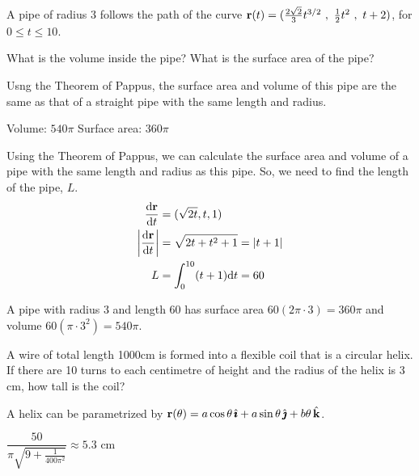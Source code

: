 \begin{question}
A pipe of radius 3 follows the path of the curve $\mathbf{r}(t)=(\frac{2\sqrt2}{3}t^{3/2}~,~\frac12t^2~,~t+2)$, for $0 \le t \le 10$. 

What is the volume inside the pipe? What is the surface area of the pipe?
\end{question}
\begin{hint}
Usng the Theorem of Pappus, the surface area and volume of this pipe are the same as that of a straight pipe with the same length and radius.
\end{hint}
\begin{answer}
Volume: $540 \pi$ \qquad Surface area: $360\pi$
\end{answer}
\begin{solution}
Using the Theorem of Pappus, we can calculate the surface area and volume of a pipe with the same length and radius as this pipe. So, we need to find the length of the pipe, $L$. 
\begin{align*}
\diff{\vr}{t}&=(\sqrt{2t},t,1)\\
\left| \diff{\vr}{t}\right|&=\sqrt{2t+t^2+1}=|t+1|\\
L&=\int_0^{10}(t+1)\dee{t}=60
\end{align*}

A pipe with radius 3 and length 60 has surface area $60(2\pi\cdot 3)=360\pi$ 
and volume $60(\pi \cdot3^2)=540\pi$.

\end{solution}

\begin{question}
A wire of total length 1000cm is formed into a flexible coil that is a 
circular helix. If there are 10 turns to each centimetre of height and the 
radius of the helix is 3 cm, how tall is the coil?
\end{question}

\begin{hint} 
A helix can be parametrized by 
$\mathbf{r}(\theta)=a\cos\theta\,\hat{\pmb{\imath}}+a\sin\theta\,\hat{\pmb{\jmath}}+b\theta\,\hat{\mathbf{k}}$.
\end{hint}

\begin{answer}
$\dfrac{50}{\pi\sqrt{9+\frac{1}{400\pi^2}}}\approx 5.3\textrm{ cm}$
\end{answer}

